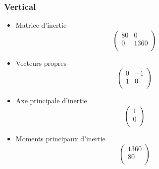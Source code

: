 \documentclass[a4paper,12pt]{report}
\begin{document}
\subsubsection*{Vertical}
\begin{itemize}
\item Matrice d'inertie 
\[
   \left (
   \begin{array}{cc}
      80 & 0 \\
      0 & 1360 \\
   \end{array}
   \right )
\]

\item Vecteurs propres
\[
   \left (
   \begin{array}{cc}
      0 & -1  \\
      1 & 0 \\
   \end{array}
   \right )
\]

\item Axe principale d'inertie
\[
   \left (
   \begin{array}{c}
      1 \\
      0 \\
   \end{array}
   \right )
\]

\item Moments principaux d'inertie
\[
   \left (
   \begin{array}{c}
      1360 \\
      80 \\
   \end{array}
   \right )
\]

\end{itemize}
\end{document}
